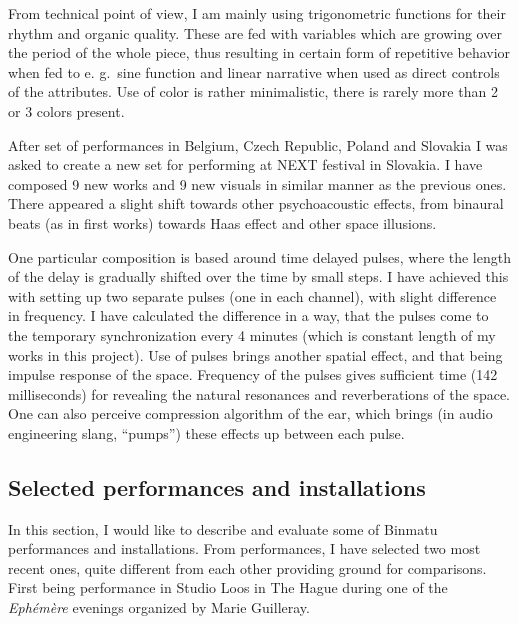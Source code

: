 \documentclass[12pt,a4paper,oneside]{report}
\begin{document}
From technical point of view, I am mainly using trigonometric functions for their rhythm and organic quality. These are fed with variables which are growing over the period of the whole piece, thus resulting in certain form of repetitive behavior when fed to e. g.\ sine function and linear narrative when used as direct controls of the attributes. Use of color is rather minimalistic, there is rarely more than 2 or 3 colors present.

After set of performances in Belgium, Czech Republic, Poland and Slovakia I was asked to create a new set for performing at NEXT festival in Slovakia. I have composed 9 new works and 9 new visuals in similar manner as the previous ones. There appeared a slight shift towards other psychoacoustic effects, from binaural beats (as in first works) towards Haas effect and other space illusions.

One particular composition is based around time delayed pulses, where the length of the delay is gradually shifted over the time by small steps. I have achieved this with setting up two separate pulses (one in each channel), with slight difference in frequency. I have calculated the difference in a way, that the pulses come to the temporary synchronization every 4 minutes (which is constant length of my works in this project). Use of pulses brings another spatial effect, and that being impulse response of the space. Frequency of the pulses gives sufficient time (142 milliseconds) for revealing the natural resonances and reverberations of the space. One can also perceive compression algorithm of the ear, which brings (in audio engineering slang, ``pumps'') these effects up between each pulse.

\subsection{Selected performances and installations} In this section, I would like to describe and evaluate some of Binmatu performances and installations. From performances, I have selected two most recent ones, quite different from each other providing ground for comparisons. First being performance in Studio Loos in The Hague during one of the \emph{Ephémère} evenings organized by Marie Guilleray. 
\end{document}
